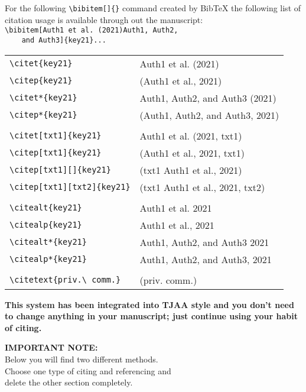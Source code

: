 \documentclass[usenatbib]{tjaa}
\begin{document}
For the following \verb|\bibitem[]{}| command created by BibTeX the following
list of citation usage is available through out the manuscript:\\
\verb|\bibitem[Auth1 et al. (2021)Auth1, Auth2,|\\
\verb|    and Auth3]{key21}...|
\small
\begin{flushleft}
\begin{tabular}{@{}p{}@{~}p{}@{}}
\verb|\citet{key21}|       & Auth1 et al. (2021) \\
\verb|\citep{key21}|       & (Auth1 et al., 2021) \\
\verb|\citet*{key21}|      & Auth1, Auth2, and Auth3 (2021) \\
\verb|\citep*{key21}|      & (Auth1, Auth2, and Auth3, 2021) \\
& \\
\verb|\citet[txt1]{key21}| & Auth1 et al. (2021, txt1) \\
\verb|\citep[txt1]{key21}| & (Auth1 et al., 2021, txt1) \\
\verb|\citep[txt1][]{key21}| & (txt1 Auth1 et al., 2021) \\
\verb|\citep[txt1][txt2]{key21}| & (txt1 Auth1 et al., 2021, txt2) \\
& \\
\verb|\citealt{key21}|     & Auth1 et al. 2021 \\
\verb|\citealp{key21}|     & Auth1 et al., 2021 \\
\verb|\citealt*{key21}|    & Auth1, Auth2, and Auth3 2021 \\
\verb|\citealp*{key21}|    & Auth1, Auth2, and Auth3, 2021 \\
& \\
\verb|\citetext{priv.\ comm.}| & (priv. comm.) \\
\end{tabular}
\end{flushleft}
\normalsize

\textbf{This system has been integrated into TJAA style and you don't need to
change anything in your manuscript; just continue using your habit of citing.}

\begin{center}
\Large\textbf{IMPORTANT NOTE:}\\
Below  you will find two different methods.\\
Choose one type of citing and referencing and\\
delete the other section completely.
\end{center}
\end{document}
